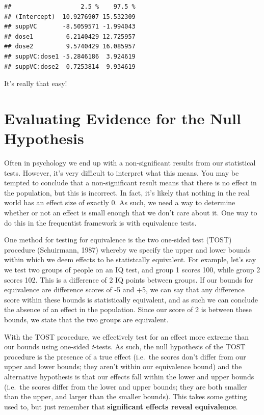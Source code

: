 \documentclass[
]{book}
\begin{document}
\begin{verbatim}
##                   2.5 %    97.5 %
## (Intercept)  10.9276907 15.532309
## suppVC       -8.5059571 -1.994043
## dose1         6.2140429 12.725957
## dose2         9.5740429 16.085957
## suppVC:dose1 -5.2846186  3.924619
## suppVC:dose2  0.7253814  9.934619
\end{verbatim}

It's really that easy!

\hypertarget{evaluating-evidence-for-the-null-hypothesis}{%
\section{Evaluating Evidence for the Null Hypothesis}\label{evaluating-evidence-for-the-null-hypothesis}}

Often in psychology we end up with a non-significant results from our statistical tests. However, it's very difficult to interpret what this means. You may be tempted to conclude that a non-significant result means that there is no effect in the population, but this is incorrect. In fact, it's likely that nothing in the real world has an effect size of exactly 0. As such, we need a way to determine whether or not an effect is small enough that we don't care about it. One way to do this in the frequentist framework is with equivalence tests.

One method for testing for equivalence is the two one-sided test (TOST) procedure (Schuirmann, 1987) whereby we specify the upper and lower bounds within which we deem effects to be statistcally equivalent. For example, let's say we test two groups of people on an IQ test, and group 1 scores 100, while group 2 scores 102. This is a difference of 2 IQ points between groups. If our bounds for equivalence are difference scores of -5 and +5, we can say that any difference score within these bounds is statistically equivalent, and as such we can conclude the absence of an effect in the population. Since our score of 2 is between these bounds, we state that the two groups are equivalent.

With the TOST procedure, we effectively test for an effect more extreme than our bounds using one-sided \emph{t}-tests. As such, the null hypothesis of the TOST procedure is the presence of a true effect (i.e.~the scores don't differ from our upper and lower bounds; they aren't within our equivalence bound) and the alternative hypothesis is that our effects fall within the lower and upper bounds (i.e.~the scores differ from the lower and upper bounds; they are both smaller than the upper, and larger than the smaller bounds). This takes some getting used to, but just remember that \textbf{significant effects reveal equivalence}.
\end{document}
